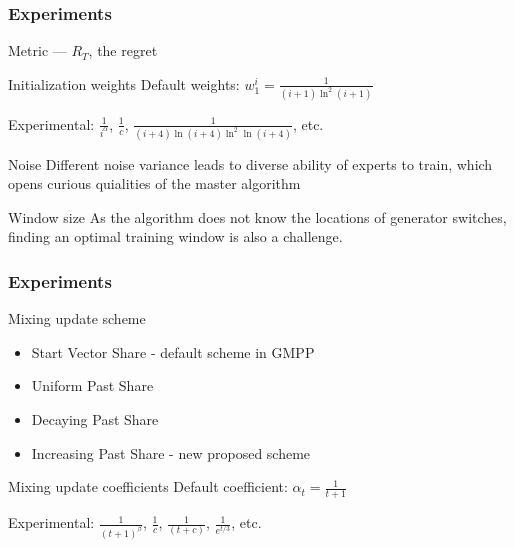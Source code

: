 \begin{frame}
\frametitle{Experiments}

Metric --- $R_T$,  the regret
\begin{block}{Initialization weights}
Default weights: $w_1^i = \frac{1}{(i+1)\ln^2(i+1)}$

Experimental:  $\frac{1}{i^\alpha}$, $\frac1c$,  $\frac{1}{(i+4)\ln(i+4)\ln^2\ln(i+4)}$, etc.
\end{block}

\begin{block}{Noise}
Different noise variance leads to diverse ability of experts to train, which opens curious quialities of the master algorithm
\end{block}

\begin{block}{Window size}
As the algorithm does not know the locations of generator switches, finding an optimal training window is also a challenge.
\end{block}




\end{frame}


\begin{frame}
\frametitle{Experiments}

\begin{block}{Mixing update scheme}

\begin{itemize}
\item Start Vector Share - default scheme in GMPP
\item Uniform Past Share
\item Decaying Past Share
\item Increasing Past Share - new proposed scheme
\end{itemize}


\end{block}

\begin{block}{Mixing update coefficients}
Default coefficient: $\alpha_t = \frac{1}{t+1}$

Experimental:  $\frac{1}{(t+1)^\beta}$, $\frac{1}{c}$, $\frac{1}{(t+c)}$, $\frac{1}{e^{t/3}}$, etc.

\end{block}

\end{frame}


